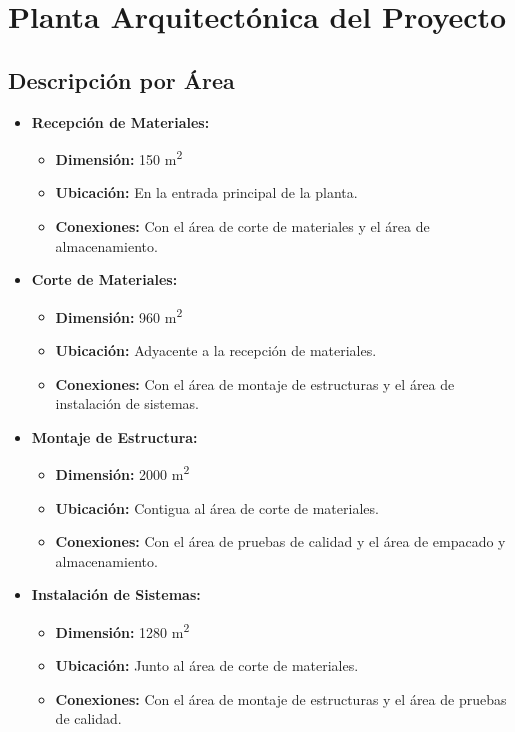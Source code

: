 \section*{Planta Arquitectónica del Proyecto}

\subsection*{\textbf{Descripción por Área}}

\begin{itemize}
    \item \textbf{Recepción de Materiales:}
    \begin{itemize}
        \item \textbf{Dimensión:} 150 m\textsuperscript{2}
        \item \textbf{Ubicación:} En la entrada principal de la planta.
        \item \textbf{Conexiones:} Con el área de corte de materiales y el área de almacenamiento.
    \end{itemize}

    \item \textbf{Corte de Materiales:}
    \begin{itemize}
        \item \textbf{Dimensión:} 960 m\textsuperscript{2}
        \item \textbf{Ubicación:} Adyacente a la recepción de materiales.
        \item \textbf{Conexiones:} Con el área de montaje de estructuras y el área de instalación de sistemas.
    \end{itemize}

    \item \textbf{Montaje de Estructura:}
    \begin{itemize}
        \item \textbf{Dimensión:} 2000 m\textsuperscript{2}
        \item \textbf{Ubicación:} Contigua al área de corte de materiales.
        \item \textbf{Conexiones:} Con el área de pruebas de calidad y el área de empacado y almacenamiento.
    \end{itemize}

    \item \textbf{Instalación de Sistemas:}
    \begin{itemize}
        \item \textbf{Dimensión:} 1280 m\textsuperscript{2}
        \item \textbf{Ubicación:} Junto al área de corte de materiales.
        \item \textbf{Conexiones:} Con el área de montaje de estructuras y el área de pruebas de calidad.
    \end{itemize}


\end{itemize}
